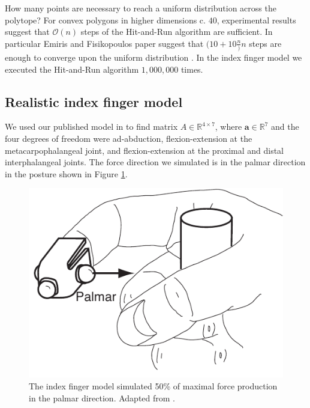 How many points are necessary to reach a uniform distribution across the polytope? For convex polygons in higher dimensions c. $40$, experimental results suggest that $\mathcal{O}(n)$ steps of the Hit-and-Run algorithm are sufficient. In particular Emiris and Fisikopoulos paper suggest that $(10 + 10\frac{n})n$ steps are enough to converge upon the uniform distribution \cite{emiris2013efficient}.
In the index finger model we executed the Hit-and-Run algorithm $1,000,000$ times.

\subsection{Realistic index finger model}
\label{ss:finger}
We used our published model in \cite{Valero-Cuevas1998Large} to find matrix $A \in \mathbb{R}^{4 \times 7}$, where $\textbf{a} \in \mathbb{R}^7$ and the four degrees of freedom were ad-abduction, flexion-extension at the metacarpophalangeal joint, and flexion-extension at the proximal and distal interphalangeal joints. The force direction we simulated is in the palmar direction in the posture shown in Figure \ref{fig:finger}.
\begin{figure}[htbp]
\centering
\includegraphics[width=7.5cm\textwidth]{sections/figs/finger.pdf}
\caption{The index finger model simulated 50\% of maximal force production in the palmar direction. Adapted from \cite{Valero-Cuevas1998Large}.}
\label{fig:finger}
\end{figure}


